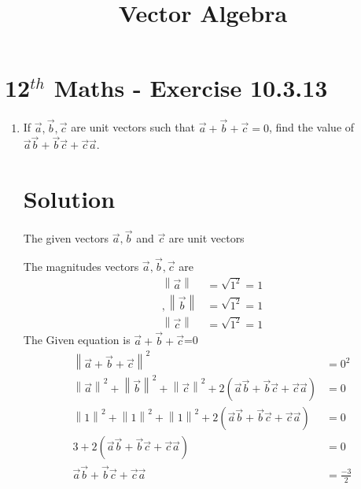 \documentclass[12pt]{article}
\providecommand{\norm}[1]{\left\lVert#1\right\rVert}
\begin{document}
\begin{center}
\title{\textbf{Vector Algebra}}
\date{\vspace{-5ex}} %
\maketitle
\end{center}
\setcounter{page}{1}
\section{12$^{th}$ Maths - Exercise 10.3.13}

\begin{enumerate}
\item If $\overrightarrow{a},\overrightarrow{b},\overrightarrow{c}$ are unit vectors such that $\overrightarrow{a}+\overrightarrow{b}+\overrightarrow{c}=0$, find the value of $\overrightarrow{a}\overrightarrow{b}+\overrightarrow{b}\overrightarrow{c}+\overrightarrow{c}\overrightarrow{a}$. 
\section{Solution}
The given vectors $\overrightarrow{a},\overrightarrow{b}$ and $\overrightarrow{c}$ are unit vectors
		
		The magnitudes vectors $\overrightarrow{a},\overrightarrow{b},\overrightarrow{c}$ are
	\begin{align}
\norm{\overrightarrow{a}} &=\sqrt{1^2}=1\\,\norm{\overrightarrow{b}}&=\sqrt{1^2}=1\\ \norm{\overrightarrow{c}}&=\sqrt{1^2}=1
	\end{align}
The Given equation is $\overrightarrow{a}+\overrightarrow{b}+\overrightarrow{c}$=0	
\begin{align}
\norm{\overrightarrow{a}+{\overrightarrow{b}}+{\overrightarrow{c}}}^2&=0^2\\
\norm{\overrightarrow{a}}^2+\norm{\overrightarrow{b}}^2+\norm{\overrightarrow{c}}^2+2({\overrightarrow{a}}{\overrightarrow{b}}+{\overrightarrow{b}}{\overrightarrow{c}}+{\overrightarrow{c}}{\overrightarrow{a}})&=0\\
\norm{1}^2+\norm{1}^2+\norm{1}^2+2({\overrightarrow{a}}{\overrightarrow{b}}+{\overrightarrow{b}}{\overrightarrow{c}}+{\overrightarrow{c}}{\overrightarrow{a}})&=0\\
3+2({\overrightarrow{a}}{\overrightarrow{b}}+{\overrightarrow{b}}{\overrightarrow{c}}+{\overrightarrow{c}}{\overrightarrow{a}})&=0\\
{\overrightarrow{a}}{\overrightarrow{b}}+{\overrightarrow{b}}{\overrightarrow{c}}+{\overrightarrow{c}}{\overrightarrow{a}}&=\frac{-3}{2}
\end{align}
\end{enumerate}
\end{document}
